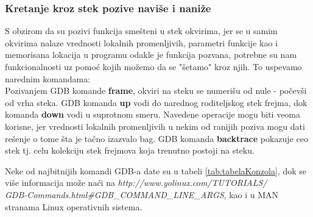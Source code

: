 \documentclass[a4paper]{article}
\begin{document}
\subsubsection{Kretanje kroz stek pozive naviše i naniže}
\label{subsec:debager_stek}

S obzirom da su pozivi funkcija smešteni u stek okvirima, jer se u samim okvirima nalaze vrednosti
lokalnih promenljivih, parametri funkcije kao i memorisana lokacija u programu odakle je funkcija pozvana, 
potrebne su nam funkcionalnosti uz pomoć kojih možemo da se "šetamo" kroz njih.
To uspevamo narednim komandama: \\
\indent Pozivanjem GDB komande \textbf{frame}, okviri na steku se numerišu od nule - počevši
od vrha steka. \newline 
\indent GDB komanda \textbf{up} vodi do narednog roditeljskog stek frejma, dok komanda \textbf{down} 
vodi u suprotnom smeru. Navedene operacije mogu biti veoma korisne, jer vrednosti lokalnih 
promenljivih u nekim od ranijih poziva mogu dati rešenje o tome šta je tačno izazvalo bag. 
GDB komanda \textbf{backtrace} pokazuje ceo stek tj. celu kolekciju stek frejmova koja trenutno postoji na steku.

Neke od najbitnijih komandi GDB-a date su u tabeli \ref{tab:tabelaKonzola}, dok se više informacija
može naći na \textit{http://www.yolinux.com/TUTORIALS/\\GDB-Commands.html\#GDB\_COMMAND\_LINE\_ARGS},
kao i u MAN stranama Linux operativnih sistema.
% 
\end{document}
